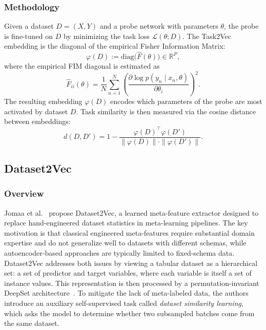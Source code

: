 \documentclass[peerreview]{IEEEtran}
\begin{document}
\subsubsection*{Methodology}
Given a dataset $D = (X, Y)$ and a probe network with parameters
$\theta$, the probe is fine-tuned on $D$ by minimizing the task loss
$\mathcal{L}(\theta; D)$. The Task2Vec embedding is the diagonal of
the empirical Fisher Information Matrix:
\begin{equation}
    \varphi(D)
    := \mathrm{diag}\bigl(\hat{F}(\theta)\bigr)
    \in \mathbb{R}^{P},
\end{equation}
where the empirical FIM diagonal is estimated as
\begin{equation}
    \hat{F}_{ii}(\theta)
    = \frac{1}{N} \sum_{n=1}^{N}
    \left(
        \frac{\partial \log p(y_n \mid x_n, \theta)}
             {\partial \theta_i}
    \right)^{2}.
\end{equation}
The resulting embedding $\varphi(D)$ encodes which parameters of the
probe are most activated by dataset $D$. Task similarity is then
measured via the cosine distance between embeddings:
\begin{equation}
    d(D, D')
    = 1 - \frac{\varphi(D)^{\top} \varphi(D')}
                {\|\varphi(D)\| \cdot \|\varphi(D')\|}.
\end{equation}

\subsection{Dataset2Vec}

\subsubsection*{Overview}
Jomaa et al.~\cite{jomaa2021dataset2vec} propose Dataset2Vec, a learned meta-feature extractor designed to replace hand-engineered dataset statistics in meta-learning pipelines. The key motivation is that classical engineered meta-features require substantial domain expertise and do not generalize well to datasets with different schemas, while autoencoder-based approaches are typically limited to fixed-schema data. Dataset2Vec addresses both issues by viewing a tabular dataset as a hierarchical set: a set of predictor and target variables, where each variable is itself a set of instance values. This representation is then processed by a permutation-invariant DeepSet architecture~\cite{zaheer2017deepsets}. To mitigate the lack of meta-labeled data, the authors introduce an auxiliary self-supervised task called \emph{dataset similarity learning}, which asks the model to determine whether two subsampled batches come from the same dataset.
\end{document}

